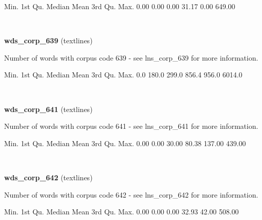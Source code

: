 \documentclass[]{article}
\newenvironment{Shaded}{\begin{snugshade}}{\end{snugshade}}
\newcommand{\FloatTok}[1]{\textcolor[rgb]{0.00,0.00,0.81}{{#1}}}
\newcommand{\NormalTok}[1]{{#1}}
\begin{document}
\begin{Shaded}
\begin{Highlighting}[]
   \NormalTok{Min. 1st Qu.  Median    Mean 3rd Qu.    Max. }
   \FloatTok{0.00}    \FloatTok{0.00}    \FloatTok{0.00}   \FloatTok{31.17}    \FloatTok{0.00}  \FloatTok{649.00} 
\end{Highlighting}
\end{Shaded}

~

\vspace{1em}

\textbf{wds\_corp\_639} (textlines)

Number of words with corpus code 639 - see lns\_corp\_639 for more
information.

\begin{Shaded}
\begin{Highlighting}[]
   \NormalTok{Min. 1st Qu.  Median    Mean 3rd Qu.    Max. }
    \FloatTok{0.0}   \FloatTok{180.0}   \FloatTok{299.0}   \FloatTok{856.4}   \FloatTok{956.0}  \FloatTok{6014.0} 
\end{Highlighting}
\end{Shaded}

~

\vspace{1em}

\textbf{wds\_corp\_641} (textlines)

Number of words with corpus code 641 - see lns\_corp\_641 for more
information.

\begin{Shaded}
\begin{Highlighting}[]
   \NormalTok{Min. 1st Qu.  Median    Mean 3rd Qu.    Max. }
   \FloatTok{0.00}    \FloatTok{0.00}   \FloatTok{30.00}   \FloatTok{80.38}  \FloatTok{137.00}  \FloatTok{439.00} 
\end{Highlighting}
\end{Shaded}

~

\vspace{1em}

\textbf{wds\_corp\_642} (textlines)

Number of words with corpus code 642 - see lns\_corp\_642 for more
information.

\begin{Shaded}
\begin{Highlighting}[]
   \NormalTok{Min. 1st Qu.  Median    Mean 3rd Qu.    Max. }
   \FloatTok{0.00}    \FloatTok{0.00}    \FloatTok{0.00}   \FloatTok{32.93}   \FloatTok{42.00}  \FloatTok{508.00} 
\end{Highlighting}
\end{Shaded}
\end{document}
